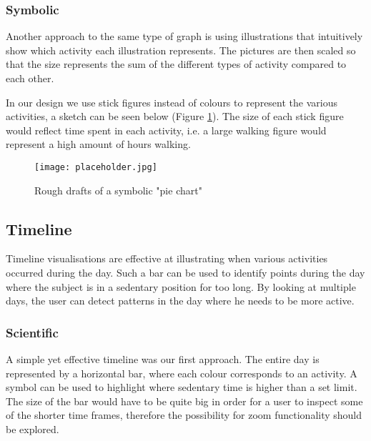 \subsubsection{Symbolic}

Another approach to the same type of graph is using illustrations that intuitively show which activity each illustration represents. The pictures are then scaled so that the size represents the sum of the different types of activity compared to each other.

In our design we use stick figures instead of colours to represent the various activities, a sketch can be seen below (Figure \ref{fig:symbolicPie}). The size of each stick figure would reflect time spent in each activity, i.e. a large walking figure would represent a high amount of hours walking. %

\begin{figure}[h!]
	\centering
		\texttt{[image: placeholder.jpg]}
		\caption{\footnotesize Rough drafts of a symbolic "pie chart"}
		\label{fig:symbolicPie}
\end{figure}

\subsection{Timeline}
Timeline visualisations are effective at illustrating when various activities occurred during the day. Such a bar can be used to identify points during the day where the subject is in a sedentary position for too long. By looking at multiple days, the user can detect patterns in the day where he needs to be more active.

\subsubsection{Scientific}
A simple yet effective timeline was our first approach. The entire day is represented by a horizontal bar, where each colour corresponds to an activity. A symbol can be used to highlight where sedentary time is higher than a set limit. The size of the bar would have to be quite big in order for a user to inspect some of the shorter time frames, therefore the possibility for zoom functionality should be explored.

